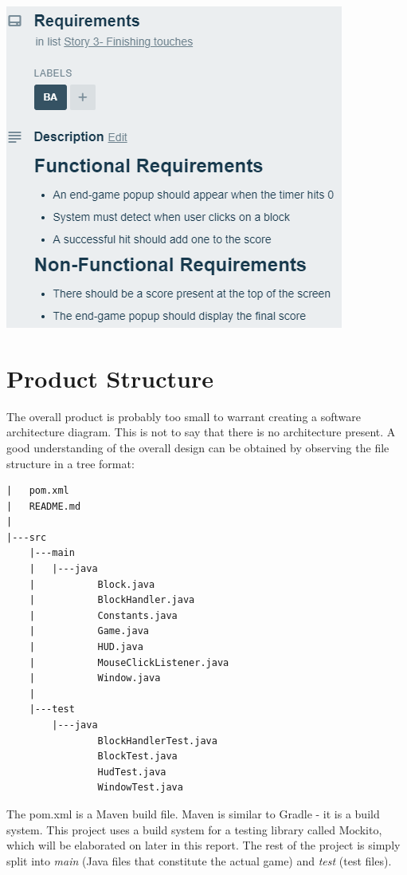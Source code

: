 \documentclass[12pt]{article}
\begin{document}
    \begin{center}
        \includegraphics[scale=0.8]{images/story3}
    \end{center}
    
    
\section{Product Structure}
The overall product is probably too small to warrant creating a software architecture diagram. This is not to say that there is no architecture present. A good understanding of the overall design can be obtained by observing the file structure in a tree format:

\begin{verbatim}
|   pom.xml
|   README.md
|
|---src
    |---main
    |   |---java
    |           Block.java
    |           BlockHandler.java
    |           Constants.java
    |           Game.java
    |           HUD.java
    |           MouseClickListener.java
    |           Window.java
    |
    |---test
        |---java
                BlockHandlerTest.java
                BlockTest.java
                HudTest.java
                WindowTest.java
\end{verbatim}

The pom.xml is a Maven build file. Maven is similar to Gradle - it is a build system. This project uses a build system for a testing library called Mockito, which will be elaborated on later in this report. The rest of the project is simply split into \emph{main} (Java files that constitute the actual game) and \emph{test} (test files). 
\end{document}
